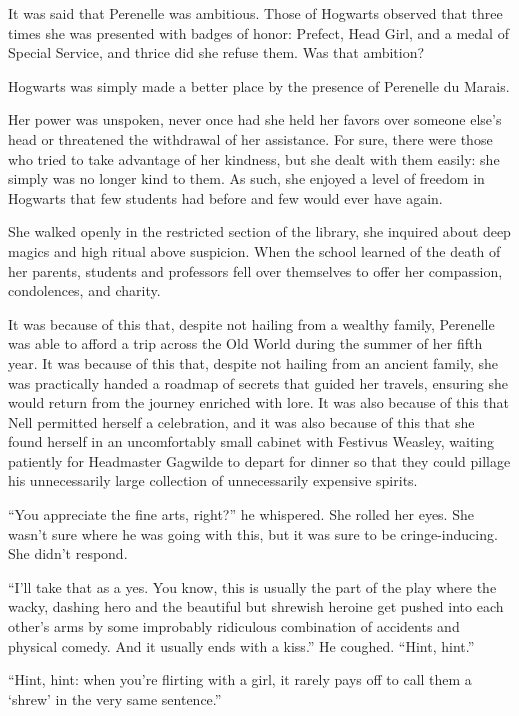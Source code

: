 It was said that Perenelle was ambitious. Those of Hogwarts observed that three times she was presented with badges of honor: Prefect, Head Girl, and a medal of Special Service, and thrice did she refuse them. Was that ambition?

Hogwarts was simply made a better place by the presence of Perenelle du Marais.

Her power was unspoken, never once had she held her favors over someone else’s head or threatened the withdrawal of her assistance. For sure, there were those who tried to take advantage of her kindness, but she dealt with them easily: she simply was no longer kind to them. As such, she enjoyed a level of freedom in Hogwarts that few students had before and few would ever have again.

She walked openly in the restricted section of the library, she inquired about deep magics and high ritual above suspicion. When the school learned of the death of her parents, students and professors fell over themselves to offer her compassion, condolences, and charity.

It was because of this that, despite not hailing from a wealthy family, Perenelle was able to afford a trip across the Old World during the summer of her fifth year. It was because of this that, despite not hailing from an ancient family, she was practically handed a roadmap of secrets that guided her travels, ensuring she would return from the journey enriched with lore.
\simpleline
It was also because of this that Nell permitted herself a celebration, and it was also because of this that she found herself in an uncomfortably small cabinet with Festivus Weasley, waiting patiently for Headmaster Gagwilde to depart for dinner so that they could pillage his unnecessarily large collection of unnecessarily expensive spirits.

“You appreciate the fine arts, right?” he whispered. She rolled her eyes. She wasn’t sure where he was going with this, but it was sure to be cringe-inducing. She didn’t respond.

“I’ll take that as a yes. You know, this is usually the part of the play where the wacky, dashing hero and the beautiful but shrewish heroine get pushed into each other’s arms by some improbably ridiculous combination of accidents and physical comedy. And it usually ends with a kiss.” He coughed. “Hint, hint.”

“Hint, hint: when you’re flirting with a girl, it rarely pays off to call them a ‘shrew’ in the very same sentence.”


